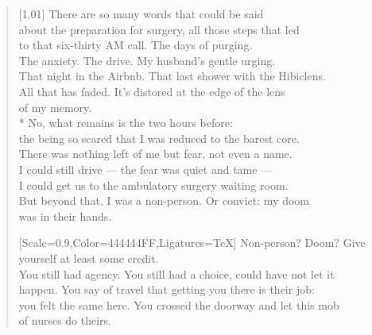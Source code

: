 \begin{verse}[1.01\textwidth]
  There are so many words that could be said\\
  about the preparation for surgery, all those steps that led\\
  to that six-thirty AM call. The days of purging.\\
  The anxiety. The drive. My husband's gentle urging.\\
  That night in the Airbnb. That last shower with the Hibiclens.\\
  All that has faded. It's distored at the edge of the lens\\
  of my memory.\\*
   No, what remains is the two hours before:\\
  the being so scared that I was reduced to the barest core.\\
  There was nothing left of me but fear, not even a name.\\
  I could still drive --- the fear was quiet and tame ---\\
  I could get us to the ambulatory surgery waiting room.\\
  But beyond that, I was a non-person. Or convict: my doom\\
  was in their hands.

  {[Scale=0.9,Color=444444FF,Ligatures=TeX]
  \vin Non-person? Doom? Give yourself at least some credit.\\
  \vin You still had agency. You still had a choice, could have not let it\\
  \vin happen. You say of travel that getting you there is their job:\\
  \vin you felt the same here. You crossed the doorway and let this mob\\
  \vin of nurses do theirs.}


\end{verse}
